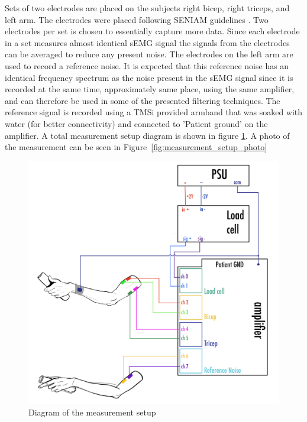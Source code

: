 Sets of two electrodes are placed on the subjects right bicep, right triceps, and left arm. The electrodes were placed following SENIAM guidelines \cite{seniam}. Two electrodes per set is chosen to essentially capture more data. Since each electrode in a set measures almost identical sEMG signal the signals from the electrodes can be averaged to reduce any present noise. The electrodes on the left arm are used to record a reference noise. It is expected that this reference noise has an identical frequency spectrum as the noise present in the sEMG signal since it is recorded at the same time, approximately same place, using the same amplifier, and can therefore be used in some of the presented filtering techniques. The reference signal is recorded using a TMSi provided armband that was soaked with water (for better connectivity) and connected to 'Patient ground' on the amplifier. A total measurement setup diagram is shown in figure \ref{fig:measurement_setup_diagram}. A photo of the measurement can be seen in Figure~\ref{fig:measurement_setup_photo}

\begin{figure}[h!t]
	\begin{center}
		\includegraphics[width=1.0\columnwidth]{images/measurement_setup_diagram.png}
	\end{center}
	\caption{Diagram of the measurement setup}
	\label{fig:measurement_setup_diagram}
\end{figure}

